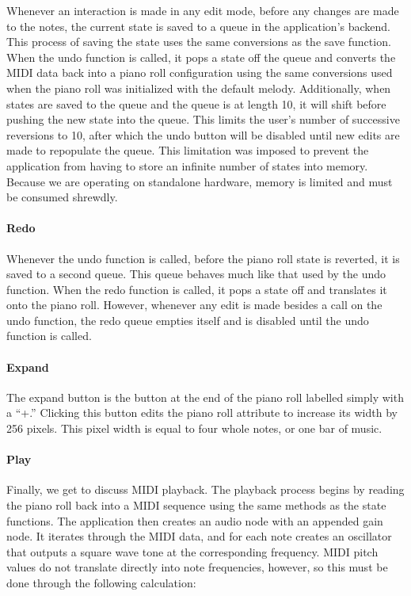 Whenever an interaction is made in any edit mode, before any changes are made to the notes, the
current state is saved to a queue in the application’s backend. This process of saving the state
uses the same conversions as the save function. When the undo function is called, it pops a state
off the queue and converts the MIDI data back into a piano roll configuration using the same
conversions used when the piano roll was initialized with the default melody. Additionally, when
states are saved to the queue and the queue is at length 10, it will shift before pushing the new
state into the queue. This limits the user’s number of successive reversions to 10, after which
the undo button will be disabled until new edits are made to repopulate the queue. This
limitation was imposed to prevent the application from having to store an infinite number of
states into memory. Because we are operating on standalone hardware, memory is limited and must be
consumed shrewdly.

\paragraph{Redo}

Whenever the undo function is called, before the piano roll state is reverted, it is saved to a
second queue. This queue behaves much like that used by the undo function. When the redo function
is called, it pops a state off and translates it onto the piano roll. However, whenever any edit is
made besides a call on the undo function, the redo queue empties itself and is disabled until the
undo function is called.

\paragraph{Expand}

The expand button is the button at the end of the piano roll labelled simply with a “+.” Clicking
this button edits the piano roll attribute to increase its width by 256 pixels. This pixel width
is equal to four whole notes, or one bar of music.


\paragraph{Play}

Finally, we get to discuss MIDI playback. The playback process begins by reading the piano roll
back into a MIDI sequence using the same methods as the state functions. The application then
creates an audio node with an appended gain node. It iterates through the MIDI data, and for each
note creates an oscillator that outputs a square wave tone at the corresponding frequency. MIDI
pitch values do not translate directly into note frequencies, however, so this must be done through
the following calculation:

